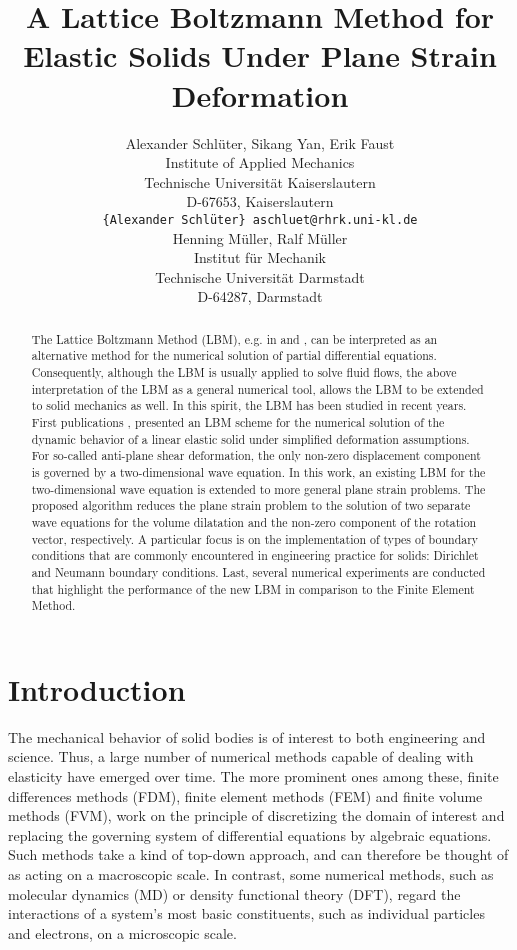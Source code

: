 \documentclass{article}
\title{A Lattice Boltzmann Method for Elastic Solids Under Plane Strain Deformation
}
\author{
  Alexander Schl\"{u}ter, Sikang Yan, Erik Faust \\
  Institute of Applied Mechanics \\
  Technische Universit\"{a}t Kaiserslautern\\
  D-67653, Kaiserslautern\\
  \texttt{\{Alexander Schl\"{u}ter\} aschluet@rhrk.uni-kl.de} \\
   \And
  Henning M\"{u}ller, Ralf M\"{u}ller \\
 Institut f\"{u}r Mechanik \\
  Technische Universität Darmstadt\\
  D-64287, Darmstadt\\
}
\begin{document}
\maketitle


\begin{abstract}
The Lattice Boltzmann Method (LBM), e.g. in \cite{chopard_lattice_1999} and \cite{kruger_lattice_2017}, can be interpreted as an alternative method for the numerical solution of partial differential equations. Consequently, although the LBM is usually applied to solve fluid flows, the above interpretation of the LBM as a general numerical tool, allows the LBM to be extended to solid mechanics as well. In this spirit, the LBM has been studied in recent years. First publications \cite{schluter_lattice_2018}, \cite{reinirkens_lattice_2018} presented an LBM scheme for the numerical solution of the dynamic behavior of a linear elastic solid under simplified deformation assumptions. For so-called anti-plane shear deformation, the only non-zero displacement component is governed by a two-dimensional wave equation. In this work, an existing LBM for the two-dimensional wave equation is extended to more general plane strain problems. The proposed algorithm reduces the plane strain problem to the solution of two separate wave equations for the volume dilatation and the non-zero component of the rotation vector, respectively. A particular focus is on the implementation of types of boundary conditions that are commonly encountered in engineering practice for solids: Dirichlet and Neumann boundary conditions. Last, several numerical experiments are conducted that highlight the performance of the new LBM in comparison to the Finite Element Method.
\end{abstract}




\section{Introduction}
\label{sec:intro}

The mechanical behavior of solid bodies is of interest to both engineering and science. Thus, a large number of numerical methods capable of dealing with elasticity have emerged over time. The more prominent ones among these, finite differences methods (FDM), finite element methods (FEM) and finite volume methods (FVM), work on the principle of discretizing the domain of interest and replacing the governing system of differential equations by algebraic equations. Such methods take a kind of top-down approach, and can therefore be thought of as acting on a macroscopic scale.
In contrast, some numerical methods, such as molecular dynamics (MD) or density functional theory (DFT), regard the interactions of a system's most basic constituents, such as individual particles and electrons, on a microscopic scale.
\end{document}
